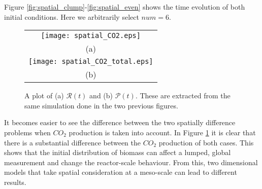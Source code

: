 Figure \ref{fig:spatial_clump}-\ref{fig:spatial_even} shows the time evolution of both initial conditions.
Here we arbitrarily select $num = 6$.

\begin{figure}
  \centering
  \begin{tabular}{c}
    \texttt{[image: spatial\_CO2.eps]} \\
    (a) \\
    \texttt{[image: spatial\_CO2\_total.eps]} \\
    (b)
  \end{tabular}
  \caption{A plot of (a) $\mathcal{R}(t)$ and (b) $\mathcal{P}(t)$.
    These are extracted from the same simulation done in the two previous figures.
  }
  \label{fig:spatial_CO2}
\end{figure}

It becomes easier to see the difference between the two spatially difference problems when $CO_2$ production is taken into account.
In Figure \ref{fig:spatial_CO2} it is clear that there is a substantial difference between the $CO_2$ production of both cases.
This shows that the initial distribution of biomass can affect a lumped, global measurement and change the reactor-scale behaviour.
From this, two dimensional models that take spatial consideration at a meso-scale can lead to different results.



